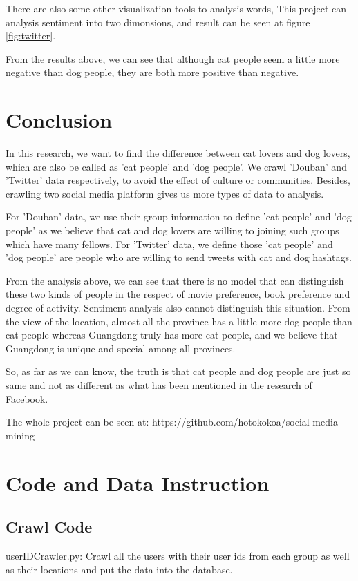 \documentclass[12pt]{article}
\begin{document}
There are also some other visualization tools to analysis words, This project \cite{healey} can analysis sentiment into two dimonsions, and result can be seen at figure \ref{fig:twitter}.

From the results above, we can see that although cat people seem a little more negative than dog people, they are both more positive than negative.

\section{Conclusion}

In this research, we want to find the difference between cat lovers and dog lovers, which are also be called as 'cat people' and 'dog people'. We crawl 'Douban' and 'Twitter' data respectively, to avoid the effect of culture or communities. Besides, crawling two social media platform gives us more types of data to analysis.

For 'Douban' data, we use their group information to define 'cat people' and 'dog people' as we believe that cat and dog lovers are willing to joining such groups which have many fellows. For 'Twitter' data, we define those 'cat people' and 'dog people' are people who are willing to send tweets with cat and dog hashtags.

From the analysis above, we can see that there is no model that can distinguish these two kinds of people in the respect of movie preference, book preference and degree of activity. Sentiment analysis also cannot distinguish this situation. From the view of the location, almost all the province has a little more dog people than cat people whereas Guangdong truly has more cat people, and we believe that Guangdong is unique and special among all provinces.

So, as far as we can know, the truth is that cat people and dog people are just so same and not as different as what has been mentioned in the research of Facebook.

The whole project can be seen at: https://github.com/hotokokoa/social-media-mining

\section{Code and Data Instruction}

\subsection{Crawl Code}
userIDCrawler.py: Crawl all the users with their user ids from each group as well as their locations and put the data into the database.
\end{document}
